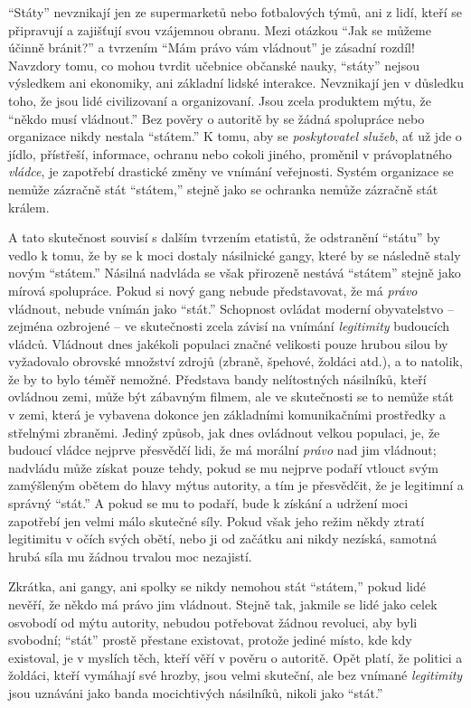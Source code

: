\documentclass{book}
\begin{document}
\enquote{Státy} nevznikají jen ze supermarketů nebo fotbalových týmů, ani z lidí, kteří se připravují a zajišťují svou vzájemnou obranu. Mezi otázkou \enquote{Jak se můžeme účinně bránit?} a tvrzením \enquote{Mám právo vám vládnout} je zásadní rozdíl! Navzdory tomu, co mohou tvrdit učebnice občanské nauky, \enquote{státy} nejsou výsledkem ani ekonomiky, ani základní lidské interakce. Nevznikají jen v důsledku toho, že jsou lidé civilizovaní a organizovaní. Jsou zcela produktem mýtu, že \enquote{někdo musí vládnout.} Bez pověry o autoritě by se žádná spolupráce nebo organizace nikdy nestala \enquote{státem.} K tomu, aby se \emph{poskytovatel služeb}, ať už jde o jídlo, přístřeší, informace, ochranu nebo cokoli jiného, proměnil v právoplatného \emph{vládce}, je zapotřebí drastické změny ve vnímání veřejnosti. Systém organizace se nemůže zázračně stát \enquote{státem,} stejně jako se ochranka nemůže zázračně stát králem.

A tato skutečnost souvisí s dalším tvrzením etatistů, že odstranění \enquote{státu} by vedlo k tomu, že by se k moci dostaly násilnické gangy, které by se následně staly novým \enquote{státem.} Násilná nadvláda se však přirozeně nestává \enquote{státem} stejně jako mírová spolupráce. Pokud si nový gang nebude představovat, že má \emph{právo} vládnout, nebude vnímán jako \enquote{stát.} Schopnost ovládat moderní obyvatelstvo -- zejména ozbrojené -- ve skutečnosti zcela závisí na vnímání \emph{legitimity} budoucích vládců. Vládnout dnes jakékoli populaci značné velikosti pouze hrubou silou by vyžadovalo obrovské množství zdrojů (zbraně, špehové, žoldáci atd.), a to natolik, že by to bylo téměř nemožné. Představa bandy nelítostných násilníků, kteří ovládnou zemi, může být zábavným filmem, ale ve skutečnosti se to nemůže stát v zemi, která je vybavena dokonce jen základními komunikačními prostředky a střelnými zbraněmi. Jediný způsob, jak dnes ovládnout velkou populaci, je, že budoucí vládce nejprve přesvědčí lidi, že má morální \emph{právo} nad jim vládnout; nadvládu může získat pouze tehdy, pokud se mu nejprve podaří vtlouct svým zamýšleným obětem do hlavy mýtus autority, a tím je přesvědčit, že je legitimní a správný \enquote{stát.} A pokud se mu to podaří, bude k získání a udržení moci zapotřebí jen velmi málo skutečné síly. Pokud však jeho režim někdy ztratí legitimitu v očích svých obětí, nebo ji od začátku ani nikdy nezíská, samotná hrubá síla mu žádnou trvalou moc nezajistí.

Zkrátka, ani gangy, ani spolky se nikdy nemohou stát \enquote{státem,} pokud lidé nevěří, že někdo má právo jim vládnout. Stejně tak, jakmile se lidé jako celek osvobodí od mýtu autority, nebudou potřebovat žádnou revoluci, aby byli svobodní; \enquote{stát} prostě přestane existovat, protože jediné místo, kde kdy existoval, je v myslích těch, kteří věří v pověru o autoritě. Opět platí, že politici a žoldáci, kteří vymáhají své hrozby, jsou velmi skuteční, ale bez vnímané \emph{legitimity} jsou uznáváni jako banda mocichtivých násilníků, nikoli jako \enquote{stát.}
\end{document}

